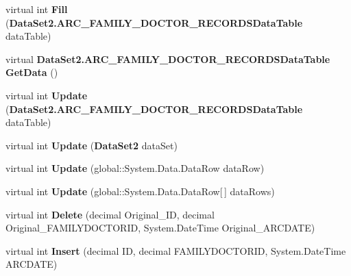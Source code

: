 \begin{CompactItemize}
\item 
virtual int \textbf{Fill} ({\bf DataSet2.ARC\_\-FAMILY\_\-DOCTOR\_\-RECORDSDataTable} dataTable)\label{class_automatic_medical_system_1_1_data_set2_table_adapters_1_1_a_r_c___f_a_m_i_l_y___d_o_c_t_o_r___r_e_c_o_r_d_s_table_adapter_b451a45e4b8fb7676b5aed8669be60c3}

\item 
virtual {\bf DataSet2.ARC\_\-FAMILY\_\-DOCTOR\_\-RECORDSDataTable} \textbf{GetData} ()\label{class_automatic_medical_system_1_1_data_set2_table_adapters_1_1_a_r_c___f_a_m_i_l_y___d_o_c_t_o_r___r_e_c_o_r_d_s_table_adapter_ac7db6cf3cd6d6500ca02b043361a2c3}

\item 
virtual int \textbf{Update} ({\bf DataSet2.ARC\_\-FAMILY\_\-DOCTOR\_\-RECORDSDataTable} dataTable)\label{class_automatic_medical_system_1_1_data_set2_table_adapters_1_1_a_r_c___f_a_m_i_l_y___d_o_c_t_o_r___r_e_c_o_r_d_s_table_adapter_48a0c2adc892c5adfc45bf5c37dd05b1}

\item 
virtual int \textbf{Update} ({\bf DataSet2} dataSet)\label{class_automatic_medical_system_1_1_data_set2_table_adapters_1_1_a_r_c___f_a_m_i_l_y___d_o_c_t_o_r___r_e_c_o_r_d_s_table_adapter_0f20b1f145ebe142ec6ffa854d5139e9}

\item 
virtual int \textbf{Update} (global::System.Data.DataRow dataRow)\label{class_automatic_medical_system_1_1_data_set2_table_adapters_1_1_a_r_c___f_a_m_i_l_y___d_o_c_t_o_r___r_e_c_o_r_d_s_table_adapter_1c7ddd0a49d95c9ff4361b212a9843d4}

\item 
virtual int \textbf{Update} (global::System.Data.DataRow[$\,$] dataRows)\label{class_automatic_medical_system_1_1_data_set2_table_adapters_1_1_a_r_c___f_a_m_i_l_y___d_o_c_t_o_r___r_e_c_o_r_d_s_table_adapter_6aba03e2bccacfee402b131e12966a11}

\item 
virtual int \textbf{Delete} (decimal Original\_\-ID, decimal Original\_\-FAMILYDOCTORID, System.DateTime Original\_\-ARCDATE)\label{class_automatic_medical_system_1_1_data_set2_table_adapters_1_1_a_r_c___f_a_m_i_l_y___d_o_c_t_o_r___r_e_c_o_r_d_s_table_adapter_4e1fcdc72c9b626cd69fe93896b2fe3b}

\item 
virtual int \textbf{Insert} (decimal ID, decimal FAMILYDOCTORID, System.DateTime ARCDATE)\label{class_automatic_medical_system_1_1_data_set2_table_adapters_1_1_a_r_c___f_a_m_i_l_y___d_o_c_t_o_r___r_e_c_o_r_d_s_table_adapter_d17d6fafd45f66f33087294f2209f391}


\end{CompactItemize}
